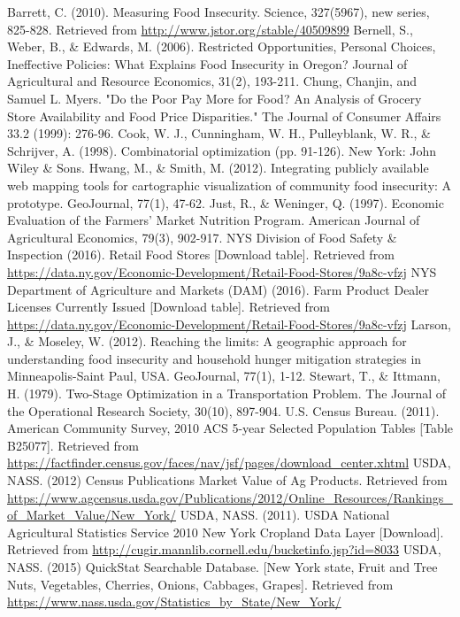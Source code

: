 \documentclass{report}
\begin{document}
\begin{thebibliography}{99}
Barrett, C. (2010). Measuring Food Insecurity. Science, 327(5967), new series, 825-828. Retrieved from \url{http://www.jstor.org/stable/40509899}
Bernell, S., Weber, B., {\&} Edwards, M. (2006). Restricted Opportunities, Personal Choices, Ineffective Policies: What Explains Food Insecurity in Oregon? Journal of Agricultural and Resource Economics, 31(2), 193-211. 
 Chung, Chanjin, and Samuel L. Myers. "Do the Poor Pay More for Food? An Analysis of Grocery Store Availability and Food Price Disparities." The Journal of Consumer Affairs 33.2 (1999): 276-96.
 Cook, W. J., Cunningham, W. H., Pulleyblank, W. R.,  {\&}  Schrijver, A. (1998). Combinatorial optimization (pp. 91-126). New York: John Wiley  {\&}  Sons.
 Hwang, M., {\&} Smith, M. (2012). Integrating publicly available web mapping tools for cartographic visualization of community food insecurity: A prototype. GeoJournal, 77(1), 47-62.
 Just, R., {\&} Weninger, Q. (1997). Economic Evaluation of the Farmers' Market Nutrition Program. American Journal of Agricultural Economics, 79(3), 902-917.
 NYS Division of Food Safety {\&} Inspection (2016). Retail Food Stores [Download table]. Retrieved from \url{https://data.ny.gov/Economic-Development/Retail-Food-Stores/9a8c-vfzj}
 NYS Department of Agriculture and Markets (DAM) (2016). Farm Product Dealer Licenses Currently Issued [Download table]. Retrieved from \url{https://data.ny.gov/Economic-Development/Retail-Food-Stores/9a8c-vfzj}
 Larson, J., {\&} Moseley, W. (2012). Reaching the limits: A geographic approach for understanding food insecurity and household hunger mitigation strategies in Minneapolis-Saint Paul, USA. GeoJournal, 77(1), 1-12.
 Stewart, T., {\&} Ittmann, H. (1979). Two-Stage Optimization in a Transportation Problem. The Journal of the Operational Research Society, 30(10), 897-904.
 U.S. Census Bureau. (2011). American Community Survey, 2010 ACS 5-year Selected Population Tables [Table B25077]. Retrieved from \url{https://factfinder.census.gov/faces/nav/jsf/pages/download_center.xhtml}
 USDA, NASS. (2012) Census Publications Market Value of Ag Products. Retrieved from \url{https://www.agcensus.usda.gov/Publications/2012/Online_Resources/Rankings_of_Market_Value/New_York/}
 USDA, NASS. (2011). USDA National Agricultural Statistics Service 2010 New York Cropland Data Layer [Download]. Retrieved from \url{http://cugir.mannlib.cornell.edu/bucketinfo.jsp?id=8033}
 USDA, NASS. (2015) QuickStat Searchable Database. [New York state, Fruit and Tree Nuts, Vegetables, Cherries, Onions, Cabbages, Grapes]. Retrieved from \url{https://www.nass.usda.gov/Statistics_by_State/New_York/}

\end{thebibliography}
\end{document}
